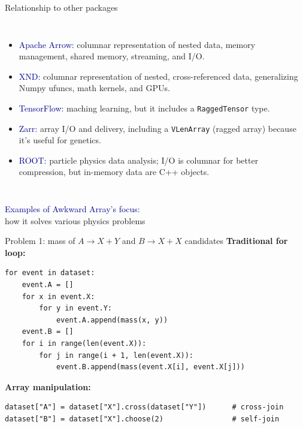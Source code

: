 \documentclass[aspectratio=169]{beamer}
\begin{document}
\begin{frame}{Relationship to other packages}
\large
\vspace{0.4 cm}
\begin{columns}
\begin{itemize}\setlength{\itemsep}{0.25 cm}
\item \textcolor{darkblue}{Apache Arrow:} columnar representation of nested data, memory management, shared memory, streaming, and I/O.

\item \textcolor{darkblue}{XND:} columnar representation of nested, cross-referenced data, generalizing Numpy ufuncs, math kernels, and GPUs.

\item \textcolor{darkblue}{TensorFlow:} maching learning, but it includes a {\tt RaggedTensor} type.

\item \textcolor{darkblue}{Zarr:} array I/O and delivery, including a {\tt VLenArray} (ragged array) because it's useful for genetics.

\item \textcolor{darkblue}{ROOT:} particle physics data analysis; I/O is columnar for better compression, but in-memory data are C++ objects.
\end{itemize}

\vspace{0.4 cm}
\end{columns}
\end{frame}

\begin{frame}{}
\LARGE
\vspace{1 cm}
\begin{center}
\textcolor{darkblue}{Examples of Awkward Array's focus:} \\ how it solves various physics problems
\end{center}
\end{frame}

\begin{frame}[fragile]{Problem 1: mass of $A \to X + Y$ and $B \to X + X$ candidates}
\vspace{0.5 cm}
{\bf Traditional for loop:} 
\small
\begin{verbatim}
for event in dataset:
    event.A = []
    for x in event.X:
        for y in event.Y:
            event.A.append(mass(x, y))
    event.B = []
    for i in range(len(event.X)):
        for j in range(i + 1, len(event.X)):
            event.B.append(mass(event.X[i], event.X[j]))
\end{verbatim}
\normalsize

\vspace{0.5 cm}
{\bf Array manipulation:} 
\small
\begin{verbatim}
dataset["A"] = dataset["X"].cross(dataset["Y"])      # cross-join
dataset["B"] = dataset["X"].choose(2)                # self-join
\end{verbatim}
\end{frame}
\end{document}
